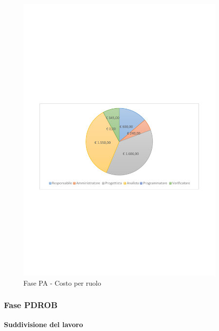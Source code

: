 \documentclass[../PianoProgetto.tex]{subfiles}
\begin{document}
	\begin{figure}[!h]
		\centering
		\includegraphics[width=0.93\textwidth , trim=2cm 9.5cm 2cm 11cm]{grafici/PA/PA-costo}
			\caption{Fase PA - Costo per ruolo}
		\label{fig:CircleChart-fasePA_costo}
	\end{figure}	
\vfill	
	\subsubsection{Fase PDROB}
				\paragraph{Suddivisione del lavoro}
					
\end{document}
